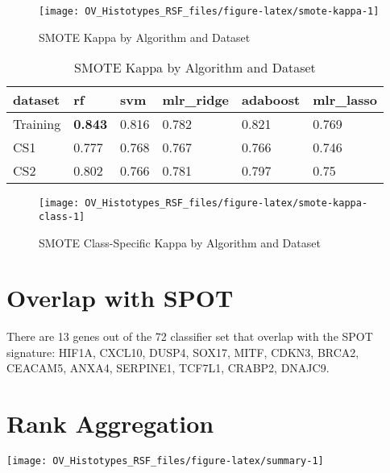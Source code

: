 \documentclass[
]{report}
\begin{document}
\begin{figure}[H]

{\centering \texttt{[image: OV\_Histotypes\_RSF\_files/figure-latex/smote-kappa-1]} 

}

\caption{SMOTE Kappa by Algorithm and Dataset}\label{fig:smote-kappa}
\end{figure}

\begin{table}

\caption{\label{tab:smote-kappa-table}SMOTE Kappa by Algorithm and Dataset}
\centering
\begin{tabular}[t]{l|l|l|l|l|l}
\hline
dataset & rf & svm & mlr\_ridge & adaboost & mlr\_lasso\\
\hline
Training & \textbf{0.843} & 0.816 & 0.782 & 0.821 & 0.769\\
\hline
CS1 & 0.777 & 0.768 & 0.767 & 0.766 & 0.746\\
\hline
CS2 & 0.802 & 0.766 & 0.781 & 0.797 & 0.75\\
\hline
\end{tabular}
\end{table}

\begin{figure}[H]

{\centering \texttt{[image: OV\_Histotypes\_RSF\_files/figure-latex/smote-kappa-class-1]} 

}

\caption{SMOTE Class-Specific Kappa by Algorithm and Dataset}\label{fig:smote-kappa-class}
\end{figure}

\hypertarget{overlap-with-spot}{%
\section{Overlap with SPOT}\label{overlap-with-spot}}

There are 13 genes out of the 72 classifier set that overlap with the SPOT signature: HIF1A, CXCL10, DUSP4, SOX17, MITF, CDKN3, BRCA2, CEACAM5, ANXA4, SERPINE1, TCF7L1, CRABP2, DNAJC9.

\hypertarget{rank-aggregation}{%
\section{Rank Aggregation}\label{rank-aggregation}}

\begin{center}\texttt{[image: OV\_Histotypes\_RSF\_files/figure-latex/summary-1]} \end{center}
\end{document}
